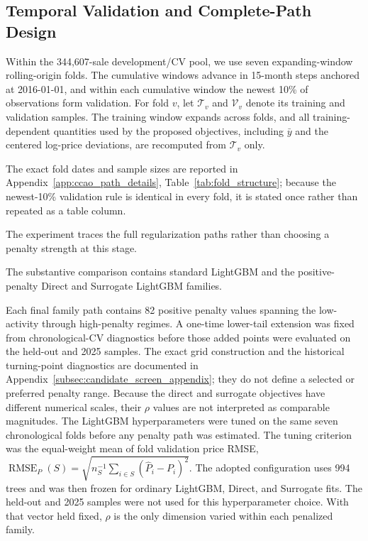 \documentclass[10pt]{article}
\theoremstyle{definition}
\newcommand{\1}{\mathbf{1}}
\begin{document}
\subsection{Temporal Validation and Complete-Path Design}
\label{subsec:path_design}

Within the 344,607-sale development/CV pool, we use seven expanding-window
rolling-origin folds. The cumulative windows advance in 15-month steps anchored at
2016-01-01, and within each cumulative window the newest 10\% of observations form
validation. For fold $v$, let $\mathcal T_v$ and $\mathcal V_v$ denote its training
and validation samples. The training window expands across folds, and all
training-dependent quantities used by the proposed objectives, including $\bar y$
and the centered log-price deviations, are recomputed from $\mathcal T_v$ only.

The exact fold dates and sample sizes are reported in Appendix~\ref{app:ccao_path_details}, Table~\ref{tab:fold_structure}; because the newest-10\% validation rule is identical in every fold, it is stated once rather than repeated as a table column.

The experiment traces the full regularization paths rather than choosing a penalty
strength at this stage.

The substantive comparison contains standard LightGBM and the positive-penalty Direct and Surrogate LightGBM families.

Each final family path contains 82 positive penalty values spanning the low-activity through high-penalty regimes. A one-time lower-tail extension was fixed from chronological-CV diagnostics before those added points were evaluated on the held-out and 2025 samples. The exact grid construction and the historical turning-point diagnostics are documented in Appendix~\ref{subsec:candidate_screen_appendix}; they do not define a selected or preferred penalty range.
Because the direct and surrogate objectives have different numerical scales, their $\rho$
values are not interpreted as comparable magnitudes. The LightGBM hyperparameters were tuned on the same seven chronological folds before any penalty path was estimated. The tuning criterion was the equal-weight mean of fold validation price RMSE, $\operatorname{RMSE}_P(S)=\sqrt{n_S^{-1}\sum_{i\in S}(\widehat P_i-P_i)^2}$. The adopted configuration uses 994 trees and was then frozen for ordinary LightGBM, Direct, and Surrogate fits. The held-out and 2025 samples were not used for this hyperparameter choice. With that vector held fixed, $\rho$ is the only dimension varied within each penalized family.
\end{document}
